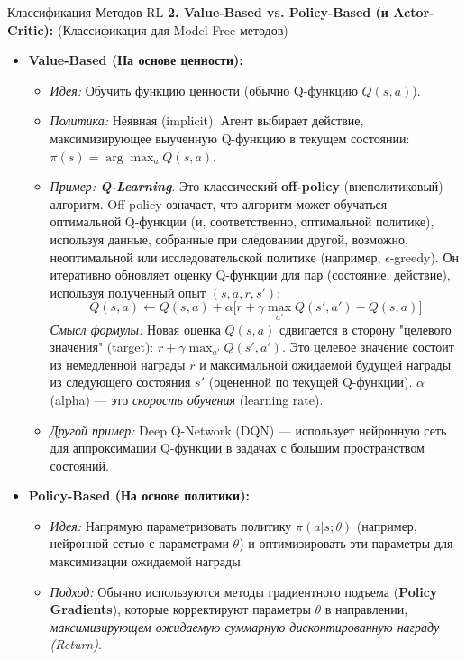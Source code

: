 \begin{myblock}{Классификация Методов RL}
    \textbf{2. Value-Based vs. Policy-Based (и Actor-Critic):} (Классификация для Model-Free методов)
    \begin{itemize}
        \item \textbf{Value-Based (На основе ценности):}
            \begin{itemize}
                \item \textit{Идея:} Обучить функцию ценности (обычно Q-функцию $Q(s,a)$).
                \item \textit{Политика:} Неявная (implicit). Агент выбирает действие, максимизирующее выученную Q-функцию в текущем состоянии: $\pi(s) = \arg\max_a Q(s,a)$.
                \item \textit{Пример: \textbf{Q-Learning}}. Это классический \textbf{off-policy} (внеполитиковый) алгоритм. Off-policy означает, что алгоритм может обучаться оптимальной Q-функции (и, соответственно, оптимальной политике), используя данные, собранные при следовании другой, возможно, неоптимальной или исследовательской политике (например, $\epsilon$-greedy). Он итеративно обновляет оценку Q-функции для пар (состояние, действие), используя полученный опыт $(s, a, r, s')$:
                \[ Q(s,a) \leftarrow Q(s,a) + \alpha \big[ r + \gamma \max_{a'} Q(s', a') - Q(s,a) \big] \]
                \textit{Смысл формулы:} Новая оценка $Q(s,a)$ сдвигается в сторону "целевого значения" (target): $r + \gamma \max_{a'} Q(s', a')$. Это целевое значение состоит из немедленной награды $r$ и максимальной ожидаемой будущей награды из следующего состояния $s'$ (оцененной по текущей Q-функции). $\alpha$ (alpha) — это \textit{скорость обучения} (learning rate).
                \item \textit{Другой пример:} Deep Q-Network (DQN) — использует нейронную сеть для аппроксимации Q-функции в задачах с большим пространством состояний.
            \end{itemize}
        \item \textbf{Policy-Based (На основе политики):}
            \begin{itemize}
                \item \textit{Идея:} Напрямую параметризовать политику $\pi(a|s; \theta)$ (например, нейронной сетью с параметрами $\theta$) и оптимизировать эти параметры для максимизации ожидаемой награды.
                \item \textit{Подход:} Обычно используются методы градиентного подъема (\textbf{Policy Gradients}), которые корректируют параметры $\theta$ в направлении, \textit{максимизирующем ожидаемую суммарную дисконтированную награду (Return)}.

\end{itemize}
\end{itemize}
\end{myblock}
